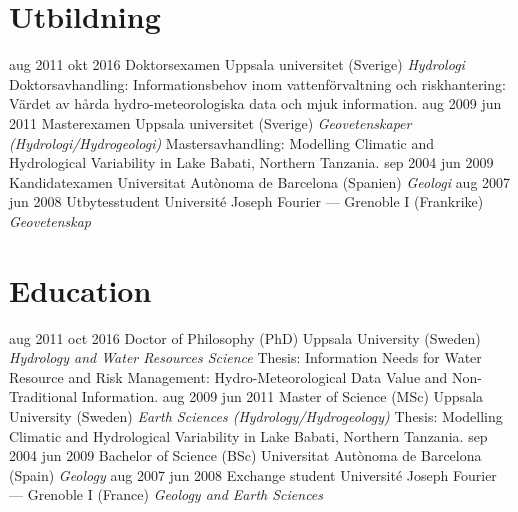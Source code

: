 \ifswedish
    \section{Utbildning}
        \position
            {aug 2011 \textemdash{} okt 2016}
            {Doktorsexamen}
            {Uppsala universitet (Sverige)}
            {\textit{Hydrologi} \newline
            Doktorsavhandling: Informationsbehov inom vattenförvaltning och riskhantering: Värdet av hårda hydro-meteorologiska data och mjuk information.}
        \position
            {aug 2009 \textemdash{} jun 2011}
            {Masterexamen}
            {Uppsala universitet (Sverige)}
            {\textit{Geovetenskaper (Hydrologi/Hydrogeologi)} \newline
            Mastersavhandling: Modelling Climatic and Hydrological Variability in Lake Babati, Northern Tanzania.}
        \position
            {sep 2004 \textemdash{} jun 2009}
            {Kandidatexamen}
            {Universitat Autònoma de Barcelona (Spanien)}
            {\textit{Geologi}}
        \position
            {aug 2007 \textemdash{} jun 2008}
            {Utbytesstudent}
            {Université Joseph Fourier --- Grenoble I (Frankrike)}
            {\textit{Geovetenskap}}
\else
    \section{Education}
        \position
            {aug 2011 \textemdash{} oct 2016}
            {Doctor of Philosophy (PhD)}
            {Uppsala University (Sweden)}
            {\textit{Hydrology and Water Resources Science} \newline
            Thesis: Information Needs for Water Resource and Risk Management: Hydro-Meteorological Data Value and Non-Traditional Information.}
        \position
            {aug 2009 \textemdash{} jun 2011}
            {Master of Science (MSc)}
            {Uppsala University (Sweden)}
            {\textit{Earth Sciences (Hydrology/Hydrogeology)} \newline
            Thesis: Modelling Climatic and Hydrological Variability in Lake Babati, Northern Tanzania.}
        \position
            {sep 2004 \textemdash{} jun 2009}
            {Bachelor of Science (BSc)}
            {Universitat Autònoma de Barcelona (Spain)}
            {\textit{Geology}}
        \position
            {aug 2007 \textemdash{} jun 2008}
            {Exchange student}
            {Université Joseph Fourier --- Grenoble I (France)}
            {\textit{Geology and Earth Sciences}}
\fi